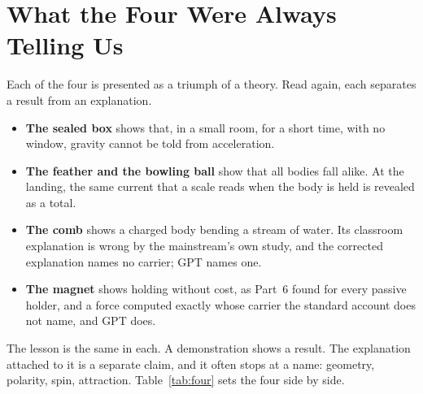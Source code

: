 \documentclass[11pt,a4paper]{article}
\begin{document}
\FloatBarrier
\section{What the Four Were Always Telling Us}
\label{sec:four}

Each of the four is presented as a triumph of a theory. Read again, each separates a result from an explanation.

\begin{itemize}
    \item \textbf{The sealed box} shows that, in a small room, for a short time, with no window, gravity cannot be told from acceleration.  
    \item \textbf{The feather and the bowling ball} show that all bodies fall alike.  At the landing, the same current that a scale reads when the body is held is revealed as a total.
    \item \textbf{The comb} shows a charged body bending a stream of water. Its classroom explanation is wrong by the mainstream's own study, and the corrected explanation names no carrier; GPT names one.
    \item \textbf{The magnet} shows holding without cost, as Part~6 found for every passive holder, and a force computed exactly whose carrier the standard account does not name, and GPT does.
\end{itemize}

The lesson is the same in each. A demonstration shows a result. The explanation attached to it is a separate claim, and it often stops at a name: geometry, polarity, spin, attraction. Table~\ref{tab:four} sets the four side by side.
\end{document}
